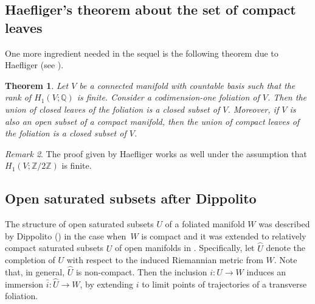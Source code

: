 \documentclass[JEP,XML,SOM,Unicode]{cedram}
\newtheorem{theorem}{Theorem}[section]
\theoremstyle{definition}
\theoremstyle{remark}
\newtheorem{remark}[theorem]{Remark}
\numberwithin{equation}{section}
\newcommand{\ZZ}{\mathbb Z}
\begin{document}
\subsection{Haefliger's theorem about the set of compact leaves}\label{sect:Haefliger}
One more ingredient needed in the sequel is the following theorem due to Haefliger (see \cite[Th.\,3.2, p.\,386]{Hae}).

\begin{theorem}\label{Haefliger}
Let $V$ be a connected manifold with countable basis such that the rank of $H_1(V;\mathbb Q)$ is finite. Consider a codimension-one
foliation of $V$. Then the union of closed leaves of the foliation is a closed subset of $V$.
Moreover, if $V$ is also an open subset of a compact manifold, then the union of compact leaves of the foliation is a closed subset of $V$.
\end{theorem}
\begin{remark}
The proof given by Haefliger works as well under the assumption that $H_1(V;\ZZ/2\ZZ)$ is finite.
\end{remark}

\subsection{Open saturated subsets after Dippolito}\label{Dippolito}
The structure of open saturated subsets $U$ of a foliated manifold $W$ was described by Dippolito (\cite{Dip})
in the case when~$W$ is compact and it was extended to relatively compact saturated subsets $U$ of open manifolds in
\cite{CaC}.
Specifically, let $\wideparen{U}$
denote the completion of $U$ with respect to the induced Riemannian metric from $W$. Note that,
in general, $\wideparen{U}$ is non-compact.
Then the inclusion $i:U\to W$ induces an immersion $\wideparen{i}:\wideparen{U}\to W$, by
extending $i$ to limit points of trajectories of a transverse foliation.
\end{document}

